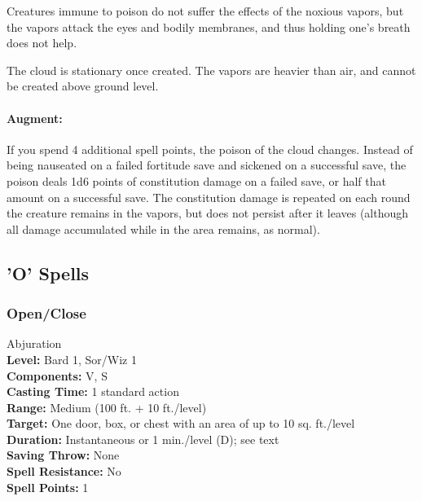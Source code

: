 Creatures immune to poison do not suffer the effects of the noxious vapors,
but the vapors attack the eyes and bodily membranes, 
and thus holding one's breath does not help.

The cloud is stationary once created. The vapors are heavier than air, and cannot be created above ground level.

\paragraph{Augment:} If you spend 4 additional spell points, the poison of the cloud changes. Instead of being nauseated on a failed
fortitude save and sickened on a successful save, the poison deals 1d6 points of constitution damage on a failed save,
or half that amount on a successful save. 
The constitution damage is repeated on each round the creature remains in the vapors, but does not persist after it leaves
(although all damage accumulated while in the area remains, as normal).
\subsection{'O' Spells}
\subsubsection{Open/Close}
\label{Spell:OpenClose}
Abjuration
\\ \textbf{Level:} Bard 1, Sor/Wiz 1
\\ \textbf{Components:} V, S
\\ \textbf{Casting Time:} 1 standard action
\\ \textbf{Range:} Medium (100 ft. + 10 ft./level)
\\ \textbf{Target:} One door, box, or chest with an area of up to 10 sq. ft./level
\\ \textbf{Duration:} Instantaneous or 1 min./level (D); see text
\\ \textbf{Saving Throw:} None
\\ \textbf{Spell Resistance:} No
\\ \textbf{Spell Points:} 1

